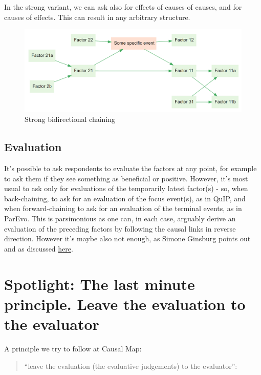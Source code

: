\documentclass[
]{book}
\begin{document}
In the strong variant, we can ask also for effects of causes of causes, and for causes of effects. This can result in any arbitrary structure.

\begin{figure}
\centering
\includegraphics{_assets/image-20210215094737856.png}
\caption{Strong bidirectional chaining}
\end{figure}

\hypertarget{evaluation}{%
\section{Evaluation}\label{evaluation}}

It's possible to ask respondents to evaluate the factors at any point, for example to ask them if they see something as beneficial or positive. However, it's most usual to ask only for evaluations of the temporarily latest factor(s) - so, when back-chaining, to ask for an evaluation of the focus event(s), as in QuIP, and when forward-chaining to ask for an evaluation of the terminal events, as in ParEvo. This is parsimonious as one can, in each case, arguably derive an evaluation of the preceding factors by following the causal links in reverse direction. However it's maybe also not enough, as Simone Ginsburg points out and as discussed \href{https://journals.sfu.ca/jmde/index.php/jmde_1/article/view/563}{here}.

\hypertarget{spotlight-the-last-minute-principle.-leave-the-evaluation-to-the-evaluator}{%
\chapter{Spotlight: The last minute principle. Leave the evaluation to the evaluator}\label{spotlight-the-last-minute-principle.-leave-the-evaluation-to-the-evaluator}}

A principle we try to follow at Causal Map:

\begin{quote}
``leave the evaluation (the evaluative judgements) to the evaluator'':
\end{quote}
\end{document}

